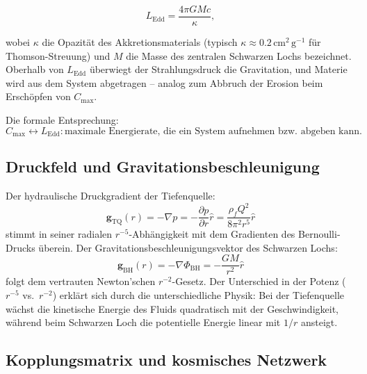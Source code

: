 ﻿\documentclass[12pt,a4paper]{report}
\begin{document}
\begin{equation}
	L_{\mathrm{Edd}} = \frac{4\pi G M c}{\kappa},
	\label{eq:eddington_luminositaet}
\end{equation}

wobei $\kappa$ die Opazität des Akkretionsmaterials (typisch $\kappa \approx 0.2\,\mathrm{cm^2\,g^{-1}}$ für Thomson-Streuung) und $M$ die Masse des zentralen Schwarzen Lochs bezeichnet. Oberhalb von $L_{\mathrm{Edd}}$ überwiegt der Strahlungsdruck die Gravitation, und Materie wird aus dem System abgetragen -- analog zum Abbruch der Erosion beim Erschöpfen von $C_{\max}$.

Die formale Entsprechung:
\begin{equation}
	C_{\max} \longleftrightarrow L_{\mathrm{Edd}}: \text{maximale Energierate, die ein System aufnehmen bzw.\ abgeben kann.}
	\label{eq:cmax_ledd_analogie}
\end{equation}

\subsection{Druckfeld und Gravitationsbeschleunigung}

Der hydraulische Druckgradient der Tiefenquelle:
\begin{equation}
	\mathbf{g}_{\mathrm{TQ}}(r) = -\nabla p = -\frac{\partial p}{\partial r}\hat{r} = \frac{\rho_f Q^2}{8\pi^2 r^5}\hat{r}
	\label{eq:druckgradient_tq}
\end{equation}
stimmt in seiner radialen $r^{-5}$-Abhängigkeit mit dem Gradienten des Bernoulli-Drucks überein. Der Gravitationsbeschleunigungsvektor des Schwarzen Lochs:
\begin{equation}
	\mathbf{g}_{\mathrm{BH}}(r) = -\nabla\Phi_{\mathrm{BH}} = -\frac{GM}{r^2}\hat{r}
	\label{eq:gravbeschleunigung_bh}
\end{equation}
folgt dem vertrauten Newton'schen $r^{-2}$-Gesetz. Der Unterschied in der Potenz ($r^{-5}$ vs.\ $r^{-2}$) erklärt sich durch die unterschiedliche Physik: Bei der Tiefenquelle wächst die kinetische Energie des Fluids quadratisch mit der Geschwindigkeit, während beim Schwarzen Loch die potentielle Energie linear mit $1/r$ ansteigt.

\subsection{Kopplungsmatrix und kosmisches Netzwerk}
\end{document}
